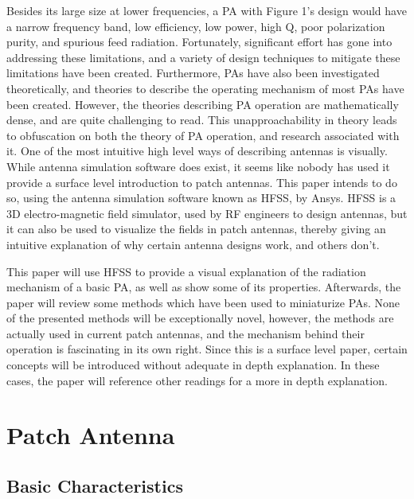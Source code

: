 \documentclass[12pt]{article}
\begin{document}
Besides its large size at lower frequencies, a PA with Figure 1's design would have a narrow frequency band, low efficiency, low power, high Q, poor polarization purity, and spurious feed radiation\cite{balanis2016antenna}. Fortunately, significant effort has gone into addressing these limitations, and a variety of design techniques to mitigate these limitations have been created\cite{balanis2016antenna}. Furthermore, PAs have also been investigated theoretically, and theories to describe the operating mechanism of most PAs have been created. However, the theories describing PA operation are mathematically dense, and are quite challenging to read. This unapproachability in theory leads to obfuscation on both the theory of PA operation, and research associated with it. One of the most intuitive high level ways of describing antennas is visually. While antenna simulation software does exist, it seems like nobody has used it provide a surface level introduction to patch antennas. This paper intends to do so, using the antenna simulation software known as HFSS, by Ansys. HFSS is a 3D electro-magnetic field simulator, used by RF engineers to design antennas, but it can also be used to visualize the fields in patch antennas, thereby giving an intuitive explanation of why certain antenna designs work, and others don't.

This paper will use HFSS to provide a visual explanation of the radiation mechanism of a basic PA, as well as show some of its properties. Afterwards, the paper will review some methods which have been used to miniaturize PAs. None of the presented methods will be exceptionally novel, however, the methods are actually used in current patch antennas, and the mechanism behind their operation is fascinating in its own right. Since this is a surface level paper, certain concepts will be introduced without adequate in depth explanation. In these cases, the paper will reference other readings for a more in depth explanation.            
  
\section{Patch Antenna}

\subsection{Basic Characteristics}

\newpage


\end{document}
